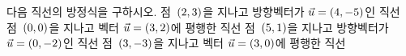 다음 직선의 방정식을 구하시오.
 점~$(2{,}\mkern3mu\mathopen{}3)$을 지나고 방향벡터가 $\vec{u}=(4{,}\mkern3mu\mathopen{}-5)$인 직선
 점~$(0{,}\mkern3mu\mathopen{}0)$을 지나고 벡터 $\vec{u}=(3{,}\mkern3mu\mathopen{}2)$에 평행한 직선
 점~$(5{,}\mkern3mu\mathopen{}1)$을 지나고 방향벡터가 $\vec{u}=(0{,}\mkern3mu\mathopen{}-2)$인 직선
 점~$(3{,}\mkern3mu\mathopen{}-3)$을 지나고 벡터 $\vec{u}=(3{,}\mkern3mu\mathopen{}0)$에 평행한 직선
